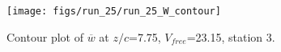 \begin{figure}[H]
\centering
\texttt{[image: figs/run\_25/run\_25\_W\_contour]}
\caption{Contour plot of $\overline{w}$ at $z/c$=7.75, $V_{free}$=23.15, station 3.}
\label{fig:run_25_W_contour}
\end{figure}


